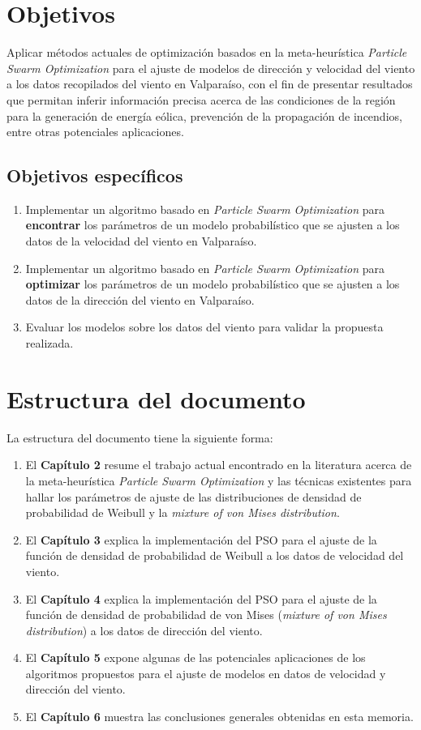\section{Objetivos}
Aplicar métodos actuales de optimización basados en la meta-heurística \emph{Particle Swarm Optimization} para el ajuste de modelos de dirección y velocidad del viento a los datos recopilados del viento en Valparaíso, con el fin de presentar resultados que permitan inferir información precisa acerca de las condiciones de la región para la generación de energía eólica, prevención de la propagación de incendios, entre otras potenciales aplicaciones.

\subsection{Objetivos específicos}
\begin{enumerate}
    \item Implementar un algoritmo basado en \emph{Particle Swarm Optimization} para \textbf{encontrar} los parámetros de un modelo probabilístico que se ajusten a los datos de la velocidad del viento en Valparaíso. 
    \item Implementar un algoritmo basado en \emph{Particle Swarm Optimization} para \textbf{optimizar} los parámetros de un modelo probabilístico que se ajusten a los datos de la dirección del viento en Valparaíso.
    \item Evaluar los modelos sobre los datos del viento para validar la propuesta realizada.
\end{enumerate}

\section{Estructura del documento}
La estructura del documento tiene la siguiente forma:
\begin{enumerate}
  \item El \textbf{Capítulo 2} resume el trabajo actual encontrado en la literatura acerca de la meta-heurística \emph{Particle Swarm Optimization} y las técnicas existentes para hallar los parámetros de ajuste de las distribuciones de densidad de probabilidad de Weibull y la \emph{mixture of von Mises distribution}.
  \item El \textbf{Capítulo 3} explica la implementación del PSO para el ajuste de la función de densidad de probabilidad de Weibull a los datos de velocidad del viento.
  \item El \textbf{Capítulo 4} explica la implementación del PSO para el ajuste de la función de densidad de probabilidad de von Mises (\emph{mixture of von Mises distribution}) a los datos de dirección del viento.
  \item El \textbf{Capítulo 5} expone algunas de las potenciales aplicaciones de los algoritmos propuestos para el ajuste de modelos en datos de velocidad y dirección del viento.
  \item El \textbf{Capítulo 6} muestra las conclusiones generales obtenidas en esta memoria. 
\end{enumerate}